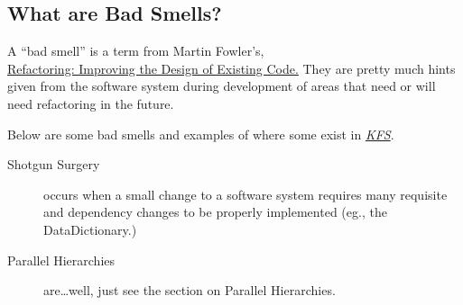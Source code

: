 \documentclass[12pt,notitlepage]{article}
\newcommand{\KFS}{\emph{\href{http://www.kuali.org}{KFS}}}
\begin{document}
\begin{s5presentation}
\begin{tex}
    \subsection{What are Bad Smells?}
    A ``bad smell'' is a term from Martin Fowler's, \\ \underline{Refactoring: Improving the Design of Existing Code.} They are pretty much hints
    given from the software system during development of areas that need or will need refactoring in the future.

    Below are some bad smells and examples of where some exist in \KFS.
    \begin{description}
      \item[Shotgun Surgery] occurs when a small change to a software system requires many requisite and dependency changes to be properly 
        implemented (eg., the DataDictionary.)
      \item[Parallel Hierarchies] are\ldots well, just see the section on Parallel Hierarchies.
    \end{description}
  \end{tex}


\end{s5presentation}
\end{document}
